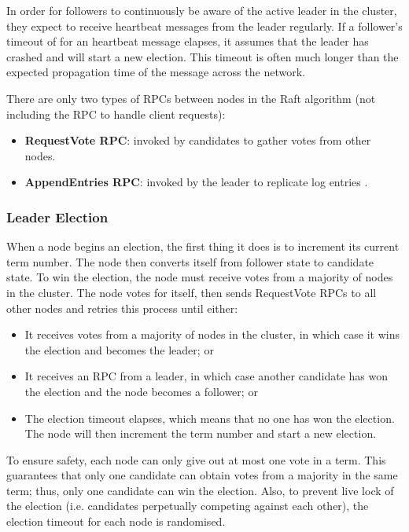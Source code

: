 \documentclass[12pt, a4paper]{article}
\begin{document}
In order for followers to continuously be aware of the active leader in the cluster, they expect to receive heartbeat messages from the leader regularly. If a follower's timeout of for an heartbeat message elapses, it assumes that the leader has crashed and will start a new election. This timeout is often much longer than the expected propagation time of the message across the network.

There are only two types of RPCs between nodes in the Raft algorithm (not including the RPC to handle client requests):
\begin{itemize}
  \item \textbf{RequestVote RPC}: invoked by candidates to gather votes \cite{conf/usenix/OngaroO14} from other nodes.
  \item \textbf{AppendEntries RPC}: invoked by the leader to replicate log entries \cite{conf/usenix/OngaroO14}.
\end{itemize}

  \subsubsection{Leader Election} \label{sec:raft-leader-elec}
  When a node begins an election, the first thing it does is to increment its current term number. The node then converts itself from follower state to candidate state. To win the election, the node must receive votes from a majority of nodes in the cluster. The node votes for itself, then sends RequestVote RPCs to all other nodes and retries this process until either:
  \begin{itemize}
    \item It receives votes from a majority of nodes in the cluster, in which case it wins the election and becomes the leader; or
    \item It receives an RPC from a leader, in which case another candidate has won the election and the node becomes a follower; or
    \item The election timeout elapses, which means that no one has won the election. The node will then increment the term number and start a new election.
  \end{itemize}

  To ensure safety, each node can only give out at most one vote in a term. This guarantees that only one candidate can obtain votes from a majority in the same term; thus, only one candidate can win the election. Also, to prevent live lock of the election (i.e. candidates perpetually competing against each other), the election timeout for each node is randomised.
\end{document}
